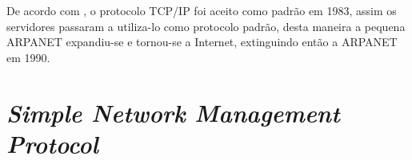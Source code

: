 
De acordo com , o protocolo TCP/IP foi
aceito como padrão em 1983, assim os servidores passaram a utiliza-lo como
protocolo padrão, desta maneira a pequena ARPANET expandiu-se e tornou-se a
Internet, extinguindo então a ARPANET em 1990.




















\section{\textit{Simple Network Management Protocol}  }

